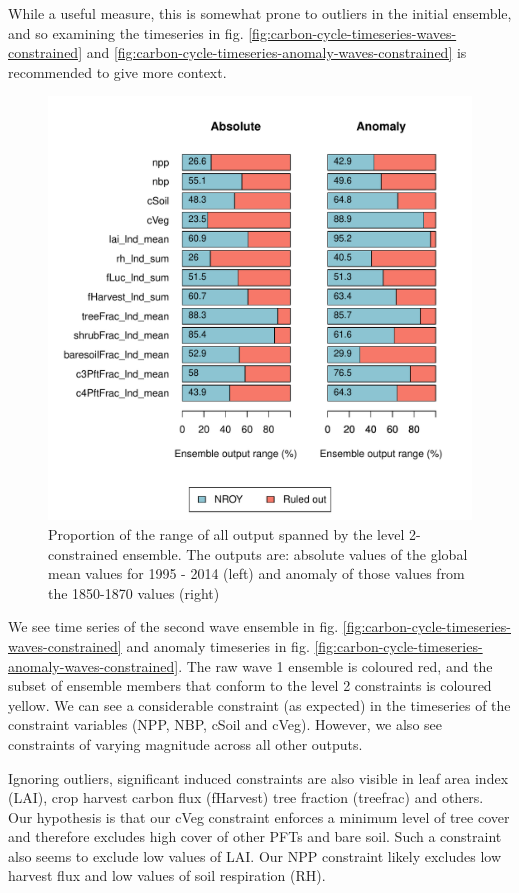 \documentclass[gmd, manuscript]{copernicus}
\begin{document}
While a useful measure, this is somewhat prone to outliers in the initial ensemble, and so examining the timeseries in fig. \ref{fig:carbon-cycle-timeseries-waves-constrained} and \ref{fig:carbon-cycle-timeseries-anomaly-waves-constrained} is recommended to give more context. 

\begin{figure}[t]
\includegraphics[width=12cm]{./figs/fig06.pdf}
\caption{Proportion of the range of all output spanned by the level 2-constrained ensemble. The outputs are: absolute values of the global mean values for 1995 - 2014 (left) and anomaly of those values from the 1850-1870 values (right)}
\label{fig:induced_constraint_barplot}
\end{figure}


We see time series of the second wave ensemble in fig. \ref{fig:carbon-cycle-timeseries-waves-constrained} and anomaly timeseries in fig. \ref{fig:carbon-cycle-timeseries-anomaly-waves-constrained}. The raw wave 1 ensemble is coloured red, and the subset of ensemble members that conform to the level 2 constraints is coloured yellow. We can see a considerable constraint (as expected) in the timeseries of the constraint variables (NPP, NBP, cSoil and cVeg). However, we also see constraints of varying magnitude across all other outputs.

Ignoring outliers, significant induced constraints are also visible in leaf area index (LAI), crop harvest carbon flux (fHarvest) tree fraction (treefrac) and others. Our hypothesis is that our cVeg constraint enforces a minimum level of tree cover and therefore excludes high cover of other PFTs and bare soil. Such a constraint also seems to exclude low values of LAI. Our NPP constraint likely excludes low harvest flux and low values of soil respiration (RH).
\end{document}
